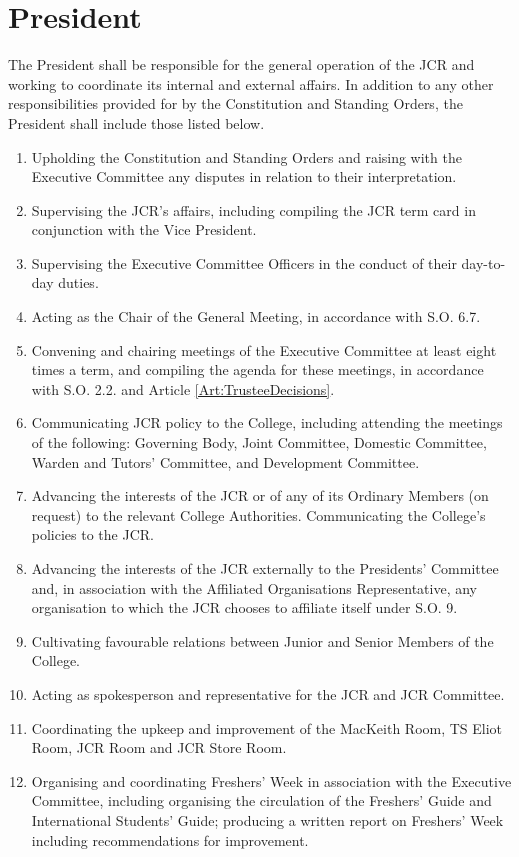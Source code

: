 \section{President}
\npara The President shall be responsible for the general operation of the JCR and working to coordinate its internal and external affairs. 
\npara In addition to any other responsibilities provided for by the Constitution and Standing Orders, the President shall include those listed below.
\begin{enumerate}
	\item Upholding the Constitution and Standing Orders and raising with the Executive Committee any disputes in relation to their interpretation.
	\item Supervising the JCR's affairs, including compiling the JCR term card in conjunction with the Vice President.     
	\item Supervising the Executive Committee Officers in the conduct of their day-to-day duties.
	\item Acting as the Chair of the General Meeting, in accordance with S.O. 6.7.     
	\item Convening and chairing meetings of the Executive Committee at least eight times a term, and compiling the agenda for these meetings, in accordance with S.O. 2.2. and Article \ref{Art:TrusteeDecisions}.
	\item Communicating JCR policy to the College, including attending the meetings of the following: Governing Body, Joint Committee, Domestic Committee, Warden and Tutors' Committee, and Development Committee.
	\item Advancing the interests of the JCR or of any of its Ordinary Members (on request) to the relevant College Authorities.
	Communicating the College's policies to the JCR.     
	\item Advancing the interests of the JCR externally to the Presidents' Committee and, in association with the Affiliated Organisations Representative, any organisation to which the JCR chooses to affiliate itself under S.O. 9.
	\item Cultivating favourable relations between Junior and Senior Members of the College.
	\item Acting as spokesperson and representative for the JCR and JCR Committee.
	\item Coordinating the upkeep and improvement of the MacKeith Room, TS Eliot Room, JCR Room and JCR Store Room.
	\item Organising and coordinating Freshers' Week in association with the Executive Committee, including organising the circulation of the Freshers' Guide and International Students' Guide; producing a written report on Freshers' Week including recommendations for improvement.

\end{enumerate}

